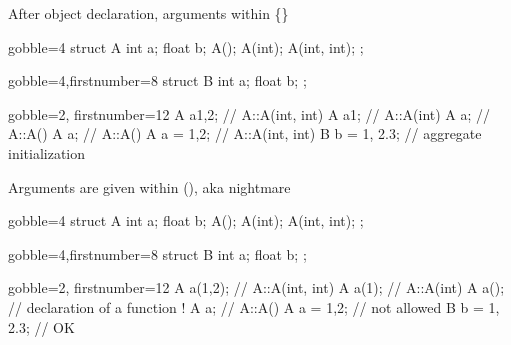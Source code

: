 \begin{frame}[fragile]
  \begin{block}{After object declaration, arguments within \{\}}
    \begin{multicols}{2}
      \begin{cppcode*}{gobble=4}
        struct A {
          int a;
          float b;
          A();
          A(int);
          A(int, int);
        };
      \end{cppcode*}
      \columnbreak
      \begin{cppcode*}{gobble=4,firstnumber=8}
        struct B {
          int a;
          float b;
        };
      \end{cppcode*}
    \end{multicols}
    \begin{cppcode*}{gobble=2, firstnumber=12}
      A a{1,2};       // A::A(int, int)
      A a{1};         // A::A(int)
      A a{};          // A::A()
      A a;            // A::A()
      A a = {1,2};    // A::A(int, int)
      B b = {1, 2.3}; // aggregate initialization
    \end{cppcode*}
  \end{block}
\end{frame}

\begin{frame}[fragile]
  \begin{block}{Arguments are given within (), aka  nightmare}
    \begin{multicols}{2}
      \begin{cppcode*}{gobble=4}
        struct A {
          int a;
          float b;
          A();
          A(int);
          A(int, int);
        };
      \end{cppcode*}
      \columnbreak
      \begin{cppcode*}{gobble=4,firstnumber=8}
        struct B {
          int a;
          float b;
        };
      \end{cppcode*}
    \end{multicols}
    \begin{cppcode*}{gobble=2, firstnumber=12}
      A a(1,2);       // A::A(int, int)
      A a(1);         // A::A(int)
      A a();          // declaration of a function !
      A a;            // A::A()
      A a = {1,2};    // not allowed
      B b = {1, 2.3}; // OK
    \end{cppcode*}
  \end{block}
\end{frame}

